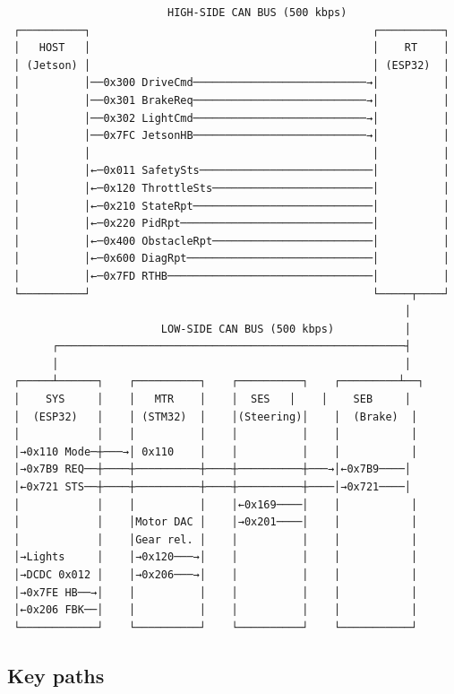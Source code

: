 \documentclass[12pt,a4paper,oneside]{report}
\begin{document}
\begin{verbatim}
                         HIGH-SIDE CAN BUS (500 kbps)
 ┌──────────┐                                            ┌──────────┐
 │   HOST   │                                            │    RT    │
 │ (Jetson) │                                            │ (ESP32)  │
 │          │──0x300 DriveCmd───────────────────────────→│          │
 │          │──0x301 BrakeReq───────────────────────────→│          │
 │          │──0x302 LightCmd───────────────────────────→│          │
 │          │──0x7FC JetsonHB───────────────────────────→│          │
 │          │                                            │          │
 │          │←─0x011 SafetySts───────────────────────────│          │
 │          │←─0x120 ThrottleSts─────────────────────────│          │
 │          │←─0x210 StateRpt────────────────────────────│          │
 │          │←─0x220 PidRpt──────────────────────────────│          │
 │          │←─0x400 ObstacleRpt─────────────────────────│          │
 │          │←─0x600 DiagRpt─────────────────────────────│          │
 │          │←─0x7FD RTHB────────────────────────────────│          │
 └──────────┘                                            └─────┬────┘
                                                              │
                        LOW-SIDE CAN BUS (500 kbps)           │
       ┌──────────────────────────────────────────────────────┤
       │                                                      │
 ┌─────┴──────┐    ┌──────────┐    ┌──────────┐    ┌─────────┴──┐
 │    SYS     │    │   MTR    │    │  SES   │    │    SEB     │
 │  (ESP32)   │    │ (STM32)  │    │(Steering)│    │  (Brake)  │
 │            │    │          │    │          │    │           │
 │→0x110 Mode─┼───→│ 0x110    │    │          │    │           │
 │→0x7B9 REQ──┼────┼──────────┼────┼──────────┼───→│←0x7B9────│
 │←0x721 STS──┼────┼──────────┼────┼──────────┼────│→0x721────│
 │            │    │          │    │←0x169────│    │           │
 │            │    │Motor DAC │    │→0x201────│    │           │
 │            │    │Gear rel. │    │          │    │           │
 │→Lights     │    │→0x120───→│    │          │    │           │
 │→DCDC 0x012 │    │→0x206───→│    │          │    │           │
 │→0x7FE HB──→│    │          │    │          │    │           │
 │←0x206 FBK──│    │          │    │          │    │           │
 └────────────┘    └──────────┘    └──────────┘    └───────────┘
\end{verbatim}

\subsection{Key paths}\label{key-paths}
\end{document}
